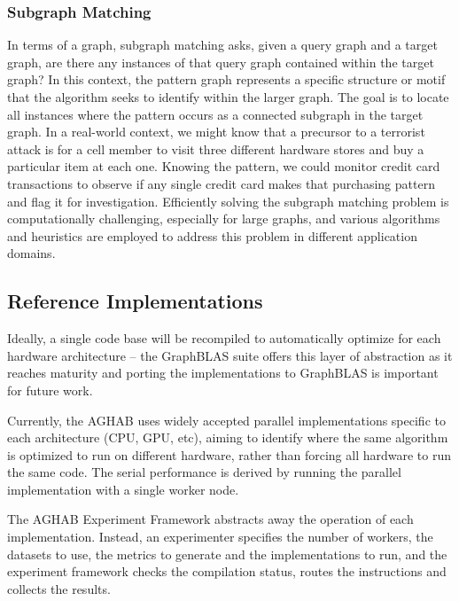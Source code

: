     \subsubsection{Subgraph Matching}
        In terms of a graph, subgraph matching asks, given a query graph and a target graph, are there any instances of that query graph contained within the target graph? 
        In this context, the pattern graph represents a specific structure or motif that the algorithm seeks to identify within the larger graph. 
        The goal is to locate all instances where the pattern occurs as a connected subgraph in the target graph. 
        In a real-world context, we might know that a precursor to a terrorist attack is for a cell member to visit three different hardware stores and buy a particular item at each one. 
        Knowing the pattern, we could monitor credit card transactions to observe if any single credit card makes that purchasing pattern and flag it for investigation. 
        Efficiently solving the subgraph matching problem is computationally challenging, especially for large graphs, and various algorithms and heuristics are employed to address this problem in different application domains. 

\subsection{Reference Implementations}\label{subsection:reference_implementations}

Ideally, a single code base will be recompiled to automatically optimize for each hardware architecture -- the GraphBLAS suite offers this layer of abstraction as it reaches maturity and porting the implementations to GraphBLAS is important for future work. 

Currently, the AGHAB uses widely accepted parallel implementations specific to each architecture (CPU, GPU, etc), aiming to identify where the same algorithm is optimized to run on different hardware, rather than forcing all hardware to run the same code.
The serial performance is derived by running the parallel implementation with a single worker node.

The AGHAB Experiment Framework abstracts away the operation of each implementation. 
Instead, an experimenter specifies the number of workers, the datasets to use, the metrics to generate and the implementations to run, and the experiment framework checks the compilation status, routes the instructions and collects the results.


